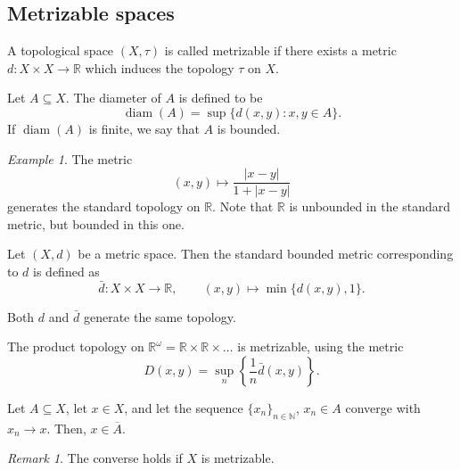 \documentclass[11pt]{article}
\newcommand{\R}{\mathbb{R}}
\newcommand{\N}{\mathbb{N}}
\DeclareMathOperator{\diam}{diam}
\theoremstyle{definition}
\theoremstyle{remark}
\newtheorem*{remark}{Remark}
\newtheorem*{example}{Example}
\numberwithin{equation}{section}
\begin{document}
    \subsection{Metrizable spaces}
    
    \begin{definition}
        A topological space $(X, \tau)$ is called metrizable if there exists a metric
        $d\colon X \times X \to \R$ which induces the topology $\tau$ on $X$.
    \end{definition}


    \begin{definition}
        Let $A \subseteq X$. The diameter of $A$ is defined to be \[
            \diam(A) = \sup\{d(x, y): x, y \in A\}.
        \] If $\diam(A)$ is finite, we say that $A$ is bounded.
    \end{definition}
    \begin{example}
        The metric \[
            (x, y) \mapsto \frac{|x - y|}{1 + |x - y|}
        \] generates the standard topology on $\R$. Note that $\R$ is unbounded in
        the standard metric, but bounded in this one.
    \end{example}

    \begin{definition}
        Let $(X, d)$ be a metric space. Then the standard bounded metric
        corresponding to $d$ is defined as \[
            \bar{d}\colon X \times X \to \R, \qquad (x, y) \mapsto \min\{d(x, y), 1\}.
        \] 
    \end{definition}

    \begin{lemma}
        Both $d$ and $\bar{d}$ generate the same topology.
    \end{lemma}


    \begin{theorem}
        The product topology on $\R^\omega = \R \times \R \times \dots$ is
        metrizable, using the metric \[
            D(x, y) = \sup_n\left\{\frac{1}{n}\bar{d}(x, y)\right\}.
        \] 
    \end{theorem}

    \begin{lemma}
        Let $A \subseteq X$, let $x \in X$, and let the sequence $\{x_n\}_{n \in
        \N}$, $x_n \in A$ converge with $x_n \to x$. Then, $x \in \overline{A}$.
        \begin{remark}
            The converse holds if $X$ is metrizable.
        \end{remark}
    \end{lemma}
\end{document}
